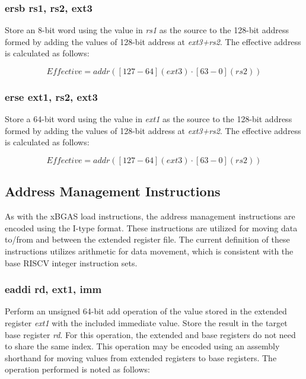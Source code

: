 \documentclass{article}
\begin{document}
\subsubsection{ersb rs1, rs2, ext3}

Store an 8-bit word using the value in \textit{rs1} as the source 
to the 128-bit address formed by adding the values of
128-bit address at \textit{ext3+rs2}.  The effective address is calculated 
as follows: 

\begin{equation}
Effective = addr([127-64](ext3) \cdot [63-0](rs2))
\end{equation}

\subsubsection{erse ext1, rs2, ext3}

Store a 64-bit word using the value in \textit{ext1} as the source 
to the 128-bit address formed by adding the values of
128-bit address at \textit{ext3+rs2}.  The effective address is calculated 
as follows: 

\begin{equation}
Effective = addr([127-64](ext3) \cdot [63-0](rs2))
\end{equation}

\subsection{Address Management Instructions}
\label{sec:AddressManagementInstructions}

As with the xBGAS load instructions, the address management instructions 
are encoded using the I-type format.  These instructions are utilized for 
moving data to/from and between the extended register file.  The current 
definition of these instructions utilizes arithmetic for data movement, 
which is consistent with the base RISCV integer instruction sets.

\subsubsection{eaddi rd, ext1, imm}

Perform an unsigned 64-bit add operation of the value stored in the extended 
register \textit{ext1} with the included immediate value.  Store the result 
in the target base register \textit{rd}.  For this operation, the extended and base registers 
do not need to share the same index.  This operation may be encoded 
using an assembly shorthand for moving values from extended registers 
to base registers.  The operation performed is noted as follows:
\end{document}
